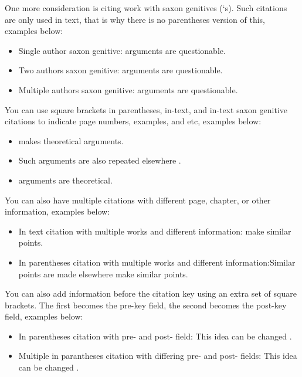 One more consideration is citing work with saxon genitives (`s). Such citations are only used in text, that is why there is no parentheses version of this, examples below:

\begin{itemize}
    \item Single author saxon genitive:  arguments are questionable.
    \item Two authors saxon genitive:  arguments are questionable.
    \item Multiple authors saxon genitive:  arguments are questionable.
\end{itemize}


You can use square brackets in parentheses, in-text, and in-text saxon genitive citations to indicate page numbers, examples, and etc, examples below:

\begin{itemize}
    \item \citet[p98]{atmaca2020} makes theoretical arguments.
    \item Such arguments are also repeated elsewhere \citep[p98]{atmaca2020}.
    \item {} arguments are theoretical.
\end{itemize}

You can also have multiple citations with different page, chapter, or other information, examples below:

\begin{itemize}
    \item In text citation with multiple works and different information: \textcites[p98]{atmaca2020}[p.70]{turk2022attraction}[p20]{turk2022resources} make similar points.
    \item In parentheses citation with multiple works and different information:Similar points are made elsewhere \parencites[p.98]{atmaca2020}[p.70]{turk2022attraction}[p.20]{turk2022resources} make similar points.
\end{itemize}

You can also add information before the citation key using an extra set of square brackets. The first becomes the pre-key field, the second becomes the post-key field, examples below:

\begin{itemize}
    \item In parentheses citation with pre- and post- field: This idea can be changed \citep[as cited in][p.20]{atmaca2020}.
    \item Multiple in parantheses citation with differing pre- and post- fields: This idea can be changed \parencites[as cited in][p.98]{atmaca2020}[as implemented in][p.70]{turk2022attraction}[as cited in][p.20]{turk2022resources}.
\end{itemize}


